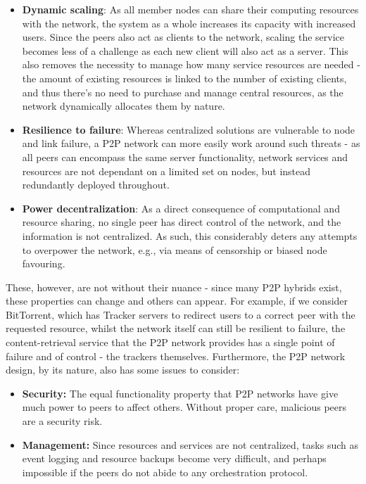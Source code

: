 \begin{itemize}
    \item \textbf{Dynamic scaling}: As all member nodes can share their computing resources with the network, the system as a whole increases its capacity with increased users. Since the peers also act as clients to the network, scaling the service becomes less of a challenge as each new client will also act as a server. This also removes the necessity to manage how many service resources are needed - the amount of existing resources is linked to the number of existing clients, and thus there's no need to purchase and manage central resources, as the network dynamically allocates them by nature.
    \item \textbf{Resilience to failure}: Whereas centralized solutions are vulnerable to node and link failure, a P2P network can more easily work around such threats - as all peers can encompass the same server functionality, network services and resources are not dependant on a limited set on nodes, but instead redundantly deployed throughout.
    \item \textbf{Power decentralization}: As a direct consequence of computational and resource sharing, no single peer has direct control of the network, and the information is not centralized. As such, this considerably deters any attempts to overpower the network, e.g., via means of censorship or biased node favouring.
\end{itemize}

    These, however, are not without their nuance - since many P2P hybrids exist, these properties can change and others can appear.
    For example, if we consider BitTorrent, which has Tracker servers to redirect users to a correct peer with the requested resource, whilst the network itself can still be resilient to failure, the content-retrieval service that the P2P network provides has a single point of failure and of control - the trackers themselves.
    Furthermore, the P2P network design, by its nature, also has some issues to consider:

\begin{itemize}
    \item \textbf{Security:} The equal functionality property that P2P networks have give much power to peers to affect others. Without proper care, malicious peers are a security risk.
    \item \textbf{Management:} Since resources and services are not centralized, tasks such as event logging and resource backups become very difficult, and perhaps impossible if the peers do not abide to any orchestration protocol.
\end{itemize}

